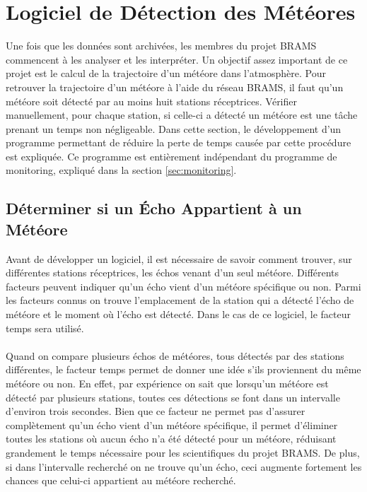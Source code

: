 \documentclass[11pt]{article}
\begin{document}
\newpage

\section{Logiciel de Détection des Météores}

Une fois que les données sont archivées, les membres du projet BRAMS commencent à les analyser et les interpréter.
Un objectif assez important de ce projet est le calcul de la trajectoire d'un météore dans l'atmosphère.
Pour retrouver la trajectoire d'un météore à l'aide du réseau BRAMS, il faut qu'un météore soit détecté par au moins huit stations réceptrices.
Vérifier manuellement, pour chaque station, si celle-ci a détecté un météore est une tâche prenant un temps non négligeable.
Dans cette section, le développement d'un programme permettant de réduire la perte de temps causée par cette procédure est expliquée.
Ce programme est entièrement indépendant du programme de monitoring, expliqué dans la section \ref{sec:monitoring}.

\subsection{Déterminer si un Écho Appartient à un Météore}

Avant de développer un logiciel, il est nécessaire de savoir comment trouver, sur différentes stations réceptrices, les échos venant d'un seul météore.
Différents facteurs peuvent indiquer qu'un écho vient d'un météore spécifique ou non.
Parmi les facteurs connus on trouve l'emplacement de la station qui a détecté l'écho de météore et le moment où l'écho est détecté.
Dans le cas de ce logiciel, le facteur temps sera utilisé.\\
\\
Quand on compare plusieurs échos de météores, tous détectés par des stations différentes, le facteur temps permet de donner une idée s'ils proviennent du même météore ou non.
En effet, par expérience on sait que lorsqu'un météore est détecté par plusieurs stations, toutes ces détections se font dans un intervalle d'environ trois secondes.
Bien que ce facteur ne permet pas d'assurer complètement qu'un écho vient d'un météore spécifique, il permet d'éliminer toutes les stations où aucun écho n'a été détecté pour un météore, réduisant grandement le temps nécessaire pour les scientifiques du projet BRAMS.
De plus, si dans l'intervalle recherché on ne trouve qu'un écho, ceci augmente fortement les chances que celui-ci appartient au météore recherché.
\end{document}
